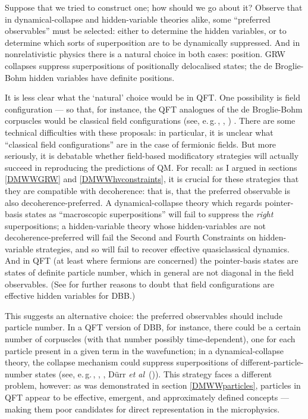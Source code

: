 \documentclass[12pt]{article}
\newcommand{\egc}{\mbox{e.\,g.\,}}
\begin{document}
Suppose that we tried to construct one; how should we go about it? Observe that in dynamical-collapse and hidden-variable theories alike, some ``preferred observables'' must be selected: either to determine the hidden variables, or to determine which sorts of superposition are to be dynamically suppressed. And in nonrelativistic physics there is a natural choice in both cases: position. GRW collapses suppress superpositions of positionally delocalised states; the de Broglie-Bohm hidden variables have definite positions. 

It is less clear what the `natural' choice would be in QFT. One possibility is field configuration --- so that, for instance, the QFT analogues of the de Broglie-Bohm corpuscles would be classical field configurations (see, \egc, , ) . There are some technical difficulties with these proposals: in particular, it is unclear what ``classical field configurations'' are in the case of fermionic fields. But more seriously, it is debatable whether field-based modificatory strategies will actually succeed in reproducing the predictions of QM. For recall: as I argued in sections \ref{DMWWGRW} and \ref{DMWWhvconstraints}, it is crucial for these strategies that they are compatible with decoherence: that is, that the preferred observable is also decoherence-preferred. A dynamical-collapse theory which regards pointer-basis states as ``macroscopic superpositions'' will fail to suppress the \emph{right} superpositions; a hidden-variable theory whose hidden-variables are not decoherence-preferred will fail the Second and Fourth Constraints on hidden-variable strategies, and so will fail to recover effective quasiclassical dynamics. And in QFT (at least where fermions are concerned) the pointer-basis states are states of definite particle number, which in general are not diagonal in the field observables. (See  for further reasons to doubt that field configurations are effective hidden variables for DBB.) 

This suggests an alternative choice: the preferred observables should include particle number. In a QFT version of DBB, for instance, there could be a certain number of corpuscles (with that number possibly time-dependent), one for each particle present in a given term in the wavefunction; in a dynamical-collapse theory, the collapse mechanism could suppress superpositions of different-particle-number states (see, \egc, , , D\"{u}rr \emph{et al}~()). This strategy faces a different problem, however: as was demonstrated in section \ref{DMWWparticles}, particles in QFT appear to be effective, emergent, and approximately defined concepts --- making them poor candidates for direct representation in the microphysics.
\end{document}
